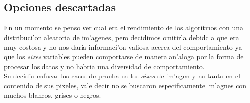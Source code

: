 \subsection{Opciones descartadas}
En un momento se penso ver cual era el rendimiento de los algoritmos con una distribuci'on 
aleatoria de im'agenes, pero decidimos omitirla debido a que era muy costosa y no nos 
daria informaci'on valiosa acerca del comportamiento ya que los \textit{sizes} variables pueden comportarse 
de manera an'aloga por la forma de procesar los datos y no habria una diversidad de comportamiento.\\
Se decidio enfocar los casos de prueba en los \textit{sizes} de im'agen y no tanto en el contenido de 
sus pixeles, vale decir no se buscaron especificamente im'agnes con muchos blancos, grises o negros.   


